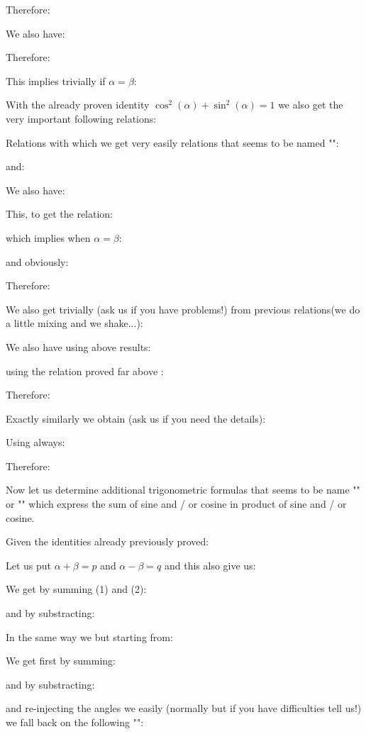 	Therefore:
	
	We also have:
	
	Therefore:
	
	This implies trivially if $\alpha=\beta$:
	
	With the already proven identity $\cos^2(\alpha)+\sin^2(\alpha)=1$ we also get the very important following relations:
	
	Relations with which we get very easily relations that seems to be named "":
	
	and: 
	
	We also have:
	
	This, to get the relation:
	
	which implies when $\alpha=\beta$:
	
	and obviously:
	
	Therefore:
	
	We also get trivially (ask us if you have problems!) from previous relations(we do a little mixing and we shake...):
	
	We also have using above results:
	
	using the relation proved far above :
	
	Therefore:
	
	Exactly similarly we obtain (ask us if you need the details):
	
	Using always:
	
	Therefore:
	
	Now let us determine additional trigonometric formulas that seems to be name "" or "" which express the sum of sine and / or cosine in product of sine and / or cosine.
	
	Given the identities already previously proved:
	
	Let us put $\alpha+\beta=p$ and $\alpha-\beta=q$ and this also give us:
	
	We get by summing (1) and (2):
	
	and by substracting:
	
	In the same way we but starting from:
	
	We get first by summing:
	
	and by substracting:
	
	and re-injecting the angles we easily (normally but if you have difficulties tell us!) we fall back on the following "":
	
